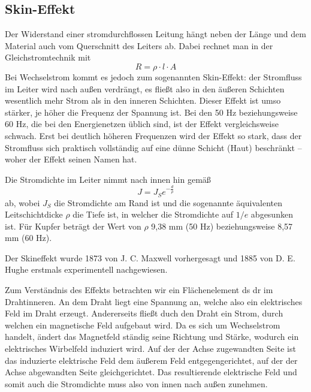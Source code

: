 
\subsection{Skin-Effekt}
Der Widerstand einer stromdurchflossen Leitung hängt neben der Länge und dem Material auch vom Querschnitt des Leiters ab. Dabei rechnet man in der Gleichstromtechnik mit
\begin{equation}
R = \rho \cdot l \cdot A
\end{equation}
Bei Wechselstrom kommt es jedoch zum sogenannten Skin-Effekt: der Stromfluss im Leiter wird nach außen verdrängt, es fließt also in den äußeren Schichten wesentlich mehr Strom als in den inneren Schichten. Dieser Effekt ist umso stärker, je höher die Frequenz der Spannung ist. Bei den 50 Hz beziehungsweise 60 Hz, die bei den Energienetzen üblich sind, ist der Effekt vergleichsweise schwach.
Erst bei deutlich höheren Frequenzen wird der Effekt so stark, dass der Stromfluss sich praktisch vollständig auf eine dünne Schicht (Haut) beschränkt -- woher der Effekt seinen Namen hat.

Die Stromdichte im Leiter nimmt nach innen hin gemäß
\begin{equation}
J = J_S e^{-\frac{d}{\rho}}
\end{equation}
ab, wobei $J_S$ die Stromdichte am Rand ist und die sogenannte äquivalenten Leitschichtdicke $\rho$ die Tiefe ist, in welcher die Stromdichte auf $1/e$ abgesunken ist. Für Kupfer beträgt der Wert von $\rho$ 9,38 mm (50 Hz) beziehungsweise 8,57 mm (60 Hz).

Der Skineffekt wurde 1873 von J. C. Maxwell vorhergesagt und 1885 von D. E. Hughe erstmals experimentell nachgewiesen\cite{BergmannSchaefer}.

Zum Verständnis des Effekts betrachten wir ein Flächenelement ds dr im Drahtinneren.
An dem Draht liegt eine Spannung an, welche also ein elektrisches Feld im Draht erzeugt.
Andererseits fließt duch den Draht ein Strom, durch welchen ein magnetische Feld aufgebaut wird.
Da es sich um Wechselstrom handelt, ändert das Magnetfeld ständig seine Richtung und Stärke, wodurch ein elektrisches Wirbelfeld induziert wird.
Auf der der Achse zugewandten Seite ist das induzierte elektrische Feld dem äußerem Feld entgegengerichtet, auf der der Achse abgewandten Seite gleichgerichtet.
Das resultierende elektrische Feld und somit auch die Stromdichte muss also von innen nach außen zunehmen.

